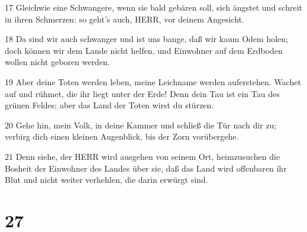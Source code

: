 \par 17 Gleichwie eine Schwangere, wenn sie bald gebären soll, sich ängstet und schreit in ihren Schmerzen: so geht's auch, HERR, vor deinem Angesicht.
\par 18 Da sind wir auch schwanger und ist uns bange, daß wir kaum Odem holen; doch können wir dem Lande nicht helfen, und Einwohner auf dem Erdboden wollen nicht geboren werden.
\par 19 Aber deine Toten werden leben, meine Leichname werden auferstehen. Wachet auf und rühmet, die ihr liegt unter der Erde! Denn dein Tau ist ein Tau des grünen Feldes; aber das Land der Toten wirst du stürzen.
\par 20 Gehe hin, mein Volk, in deine Kammer und schließ die Tür nach dir zu; verbirg dich einen kleinen Augenblick, bis der Zorn vorübergehe.
\par 21 Denn siehe, der HERR wird ausgehen von seinem Ort, heimzusuchen die Bosheit der Einwohner des Landes über sie, daß das Land wird offenbaren ihr Blut und nicht weiter verhehlen, die darin erwürgt sind.

\chapter{27}

